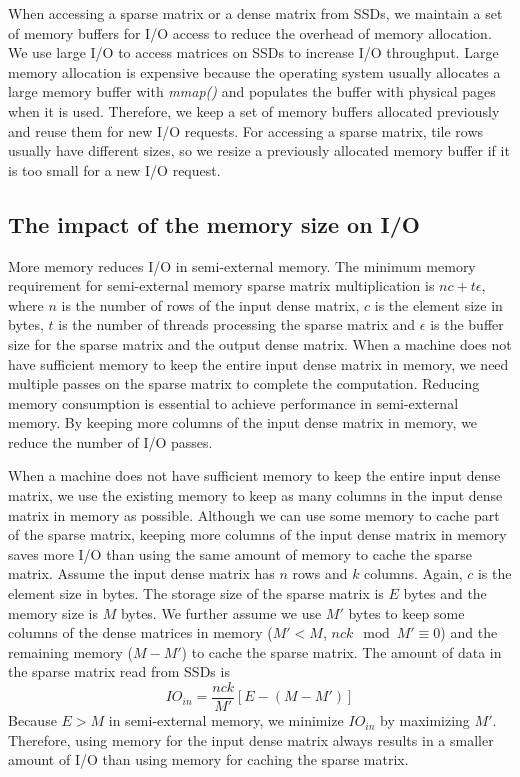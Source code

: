When accessing a sparse matrix or a dense matrix from SSDs, we maintain a set of
memory buffers for I/O access to reduce the overhead of memory allocation.
We use large I/O to access matrices on SSDs to increase I/O throughput.
Large memory allocation is expensive because the operating
system usually allocates a large memory buffer with \textit{mmap()} and
populates the buffer with physical pages when it is used. Therefore, we keep
a set of memory buffers allocated previously and reuse them for new I/O requests.
For accessing a sparse matrix, tile rows usually have different sizes, so we resize
a previously allocated memory buffer if it is too small for a new I/O request.

\subsection{The impact of the memory size on I/O}
\label{sec:mem}
More memory reduces I/O in semi-external memory.
The minimum memory requirement for semi-external memory sparse matrix
multiplication is $n c + t \epsilon$, where $n$ is the number of rows
of the input dense matrix, $c$ is the element size in bytes,
$t$ is the number of threads processing the sparse matrix
and $\epsilon$ is the buffer size for the sparse matrix and the output
dense matrix. When a machine does not have sufficient memory to keep the entire
input dense matrix in memory, we need multiple passes on the sparse matrix to
complete the computation. Reducing memory consumption is essential
to achieve performance in semi-external memory. By keeping more columns of
the input dense matrix in memory, we reduce the number of I/O passes.

When a machine does not have sufficient memory to keep the entire input dense
matrix, we use the existing memory to keep as many columns in the input
dense matrix in memory as possible. Although we can use some memory to cache
part of the sparse matrix,
keeping more columns of the input dense matrix in memory saves more I/O than
using the same amount of memory to cache the sparse matrix. Assume the input
dense matrix has $n$ rows and $k$ columns. Again, $c$ is the element size
in bytes. The storage size of the sparse
matrix is $E$ bytes and the memory size is $M$ bytes. We further assume
we use $M'$ bytes to keep some columns of the dense matrices in memory
($M' < M$, ${n c k} \mod {M'} \equiv 0$)
and the remaining memory ($M - M'$) to cache the sparse matrix.
The amount of data in the sparse matrix read from SSDs is
\begin{equation*}
IO_{in} = \frac{n c k}{M'} [E - (M - M')]
\end{equation*}
Because $E > M$ in semi-external memory, we minimize $IO_{in}$ by maximizing $M'$.
Therefore, using memory for the input dense matrix always results in a smaller
amount of I/O than using memory for caching the sparse matrix.

